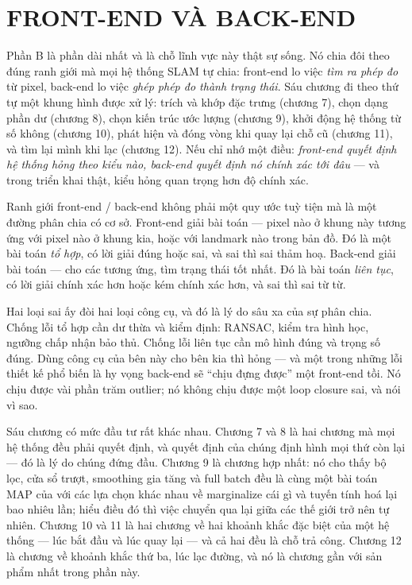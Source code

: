 \documentclass[../vslam.tex]{subfiles}
\begin{document}
\part{FRONT-END VÀ BACK-END}
\begin{tomtat}
Phần B là phần dài nhất và là chỗ lĩnh vực này thật sự sống. Nó chia đôi theo đúng ranh giới mà mọi hệ thống SLAM tự chia: front-end lo việc \emph{tìm ra phép đo} từ pixel, back-end lo việc \emph{ghép phép đo thành trạng thái}. Sáu chương đi theo thứ tự một khung hình được xử lý: trích và khớp đặc trưng (chương 7), chọn dạng phần dư (chương 8), chọn kiến trúc ước lượng (chương 9), khởi động hệ thống từ số không (chương 10), phát hiện và đóng vòng khi quay lại chỗ cũ (chương 11), và tìm lại mình khi lạc (chương 12). Nếu chỉ nhớ một điều: \emph{front-end quyết định hệ thống hỏng theo kiểu nào, back-end quyết định nó chính xác tới đâu} --- và trong triển khai thật, kiểu hỏng quan trọng hơn độ chính xác.
\end{tomtat}

Ranh giới front-end / back-end không phải một quy ước tuỳ tiện mà là một đường phân chia có cơ sở. Front-end giải bài toán  --- pixel nào ở khung này tương ứng với pixel nào ở khung kia, hoặc với landmark nào trong bản đồ. Đó là một bài toán \emph{tổ hợp}, có lời giải đúng hoặc sai, và sai thì sai thảm hoạ. Back-end giải bài toán  --- cho các tương ứng, tìm trạng thái tốt nhất. Đó là bài toán \emph{liên tục}, có lời giải chính xác hơn hoặc kém chính xác hơn, và sai thì sai từ từ.

Hai loại sai ấy đòi hai loại công cụ, và đó là lý do sâu xa của sự phân chia. Chống lỗi tổ hợp cần dư thừa và kiểm định: RANSAC, kiểm tra hình học, ngưỡng chấp nhận bảo thủ. Chống lỗi liên tục cần mô hình đúng và trọng số đúng. Dùng công cụ của bên này cho bên kia thì hỏng --- và một trong những lỗi thiết kế phổ biến là hy vọng back-end sẽ ``chịu đựng được'' một front-end tồi. Nó chịu được vài phần trăm outlier; nó không chịu được một loop closure sai, và  nói vì sao.

Sáu chương có mức đầu tư rất khác nhau. Chương 7 và 8 là hai chương mà mọi hệ thống đều phải quyết định, và quyết định của chúng định hình mọi thứ còn lại --- đó là lý do chúng đứng đầu. Chương 9 là chương hợp nhất: nó cho thấy bộ lọc, cửa sổ trượt, smoothing gia tăng và full batch đều là cùng một bài toán MAP của  với các lựa chọn khác nhau về marginalize cái gì và tuyến tính hoá lại bao nhiêu lần; hiểu điều đó thì việc chuyển qua lại giữa các thế giới trở nên tự nhiên. Chương 10 và 11 là hai chương về hai khoảnh khắc đặc biệt của một hệ thống --- lúc bắt đầu và lúc quay lại --- và cả hai đều là chỗ  trả công. Chương 12 là chương về khoảnh khắc thứ ba, lúc lạc đường, và nó là chương gần với sản phẩm nhất trong phần này.
\end{document}
